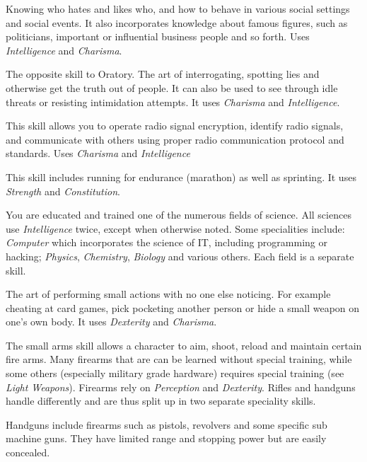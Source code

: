 \begin{description}
   Knowing who hates and likes who, and how to behave in
  various social settings and social events. It also incorporates knowledge about
  famous figures, such as politicians, important or influential business people
  and so forth. Uses \emph{Intelligence} and \emph{Charisma}.

   The opposite skill to Oratory. The art of interrogating,
  spotting lies and otherwise get the truth out of people. It can also be used
  to see through idle threats or resisting intimidation attempts. It uses
  \emph{Charisma} and \emph{Intelligence}.

   This skill allows you to operate radio signal
  encryption, identify radio signals, and communicate with others using proper
  radio communication protocol and standards. Uses \emph{Charisma} and
  \emph{Intelligence}

   This skill includes running for endurance (marathon) as well as
  sprinting. It uses \emph{Strength} and \emph{Constitution}.

   You are educated and trained one of the
  numerous fields of science. All sciences use \emph{Intelligence} twice, except
  when otherwise noted. Some specialities include: \emph{Computer} which
  incorporates the science of IT, including programming or hacking;
  \emph{Physics}, \emph{Chemistry}, \emph{Biology} and various others. Each
  field is a separate skill.

   The art of performing small actions with no one else
  noticing. For example cheating at card games, pick pocketing another person
  or hide a small weapon on one's own body. It uses \emph{Dexterity} and
  \emph{Charisma}.

   The small arms skill allows a character to aim, shoot,
  reload and maintain certain fire arms. Many firearms that are can be learned
  without special training, while some others (especially military grade
  hardware) requires special training (see \emph{Light Weapons}). Firearms rely
  on \emph{Perception} and \emph{Dexterity}. Rifles and handguns handle
  differently and are thus split up in two separate speciality skills.

   Handguns include firearms such as
  pistols, revolvers and some specific sub machine guns. They have limited range
  and stopping power but are easily concealed.


\end{description}
